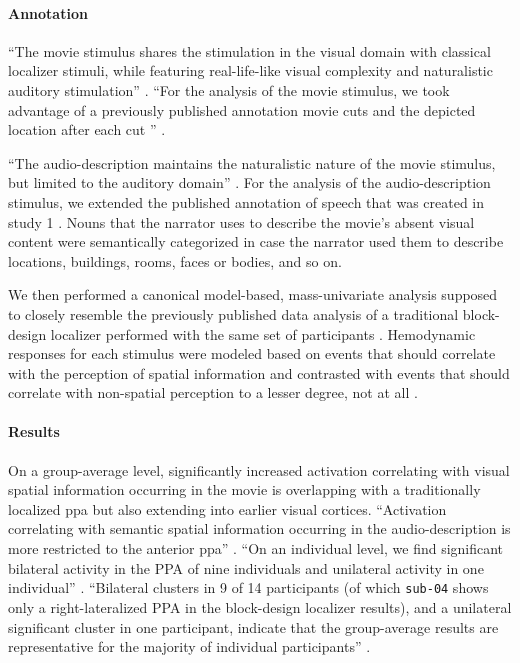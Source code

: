 \paragraph{Annotation}

``The movie stimulus shares the stimulation in the visual domain with classical
localizer stimuli, while featuring real-life-like visual complexity and
naturalistic auditory stimulation'' \citep{haeusler2022processing}.
``For the analysis of the movie stimulus, we took advantage of a previously
published annotation movie cuts and the depicted location after each cut
\citep{haeusler2016cutanno}'' \citep{haeusler2022processing}.

``The audio-description maintains the naturalistic nature of the movie stimulus,
but limited to the auditory domain'' \citep{haeusler2022processing}.
For the analysis of the audio-description stimulus, we extended the published
annotation of speech that was created in study 1 \citep{haeusler2021speechanno}.
%
Nouns that the narrator uses to describe the movie's absent visual content were
semantically categorized in case the narrator used them to describe locations,
buildings, rooms, faces or bodies, and so on.

We then performed a canonical model-based, mass-univariate analysis supposed to
closely resemble the previously published data analysis of a traditional
block-design localizer performed with the same set of participants
\citep{sengupta2016extension}.
Hemodynamic responses for each stimulus were modeled based on events that should
correlate with the perception of spatial information and contrasted with events
that should correlate with non-spatial perception to a lesser degree, not at all
\citep{haeusler2022processing}.


\paragraph{Results}

On a group-average level, significantly increased activation correlating with
visual spatial information occurring in the movie is overlapping with a
traditionally localized \ac{ppa} but also extending into earlier visual
cortices.
``Activation correlating with semantic spatial information occurring in the
audio-description is more restricted to the anterior \ac{ppa}''
\citep{haeusler2022processing}.
``On an individual level, we find significant bilateral activity in the PPA of
nine individuals and unilateral activity in one individual''
\citep{haeusler2022processing}.
``Bilateral clusters in 9 of 14 participants (of which \texttt{sub-04} shows
only a right-lateralized PPA in the block-design localizer results), and a
unilateral significant cluster in one participant, indicate that the
group-average results are representative for the majority of individual
participants'' \citep{haeusler2022processing}.


